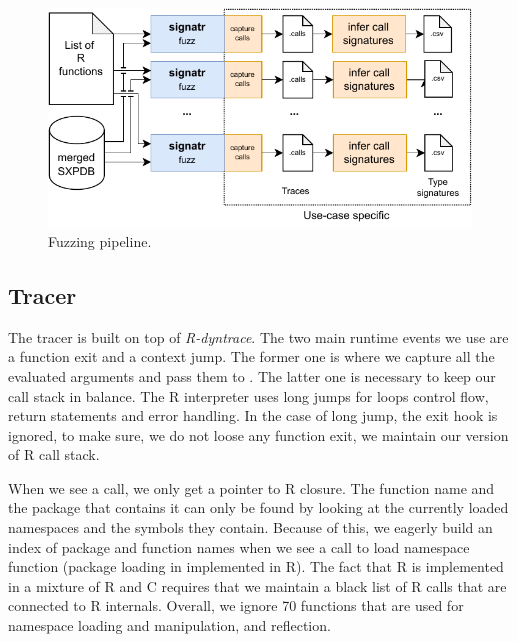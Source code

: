\documentclass[sigplan,anonymous,review]{acmart}
\begin{document}
\begin{figure}
    \centering
    \includegraphics[width=\columnwidth]{code-and-figures/fuzz-pipeline.pdf}
    \caption{
    Fuzzing pipeline.
    }\label{fig:fuzz-pipeline}
\end{figure}

\subsection{Tracer}

The tracer is built on top of \emph{R-dyntrace}.
The two main runtime events we use are a function exit and a context jump.
The former one is where we capture all the evaluated arguments and pass them to \sxpdb.
The latter one is necessary to keep our call stack in balance.
The R interpreter uses long jumps for loops control flow, return statements and error handling.
In the case of long jump, the exit hook is ignored, to make sure, we do not loose any function exit, we maintain our version of R call stack.

When we see a call, we only get a pointer to R closure.
The function name and the package that contains it can only be found by looking at the currently loaded namespaces and the symbols they contain.
Because of this, we eagerly build an index of package and function names when we see a call to load namespace function (package loading in implemented in R).
The fact that R is implemented in a mixture of R and C requires that we maintain a black list of R calls that are connected to R internals.
Overall, we ignore 70 functions that are used for namespace loading and manipulation, and reflection.
\end{document}
